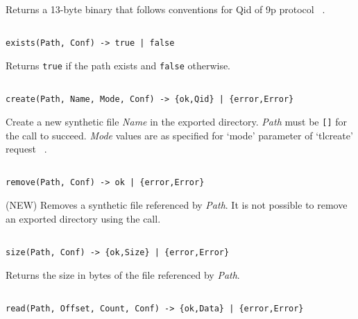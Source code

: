 Returns a 13-byte binary that follows conventions for Qid of 9p protocol
~\citep{9pintro}.

\begin{adjustwidth}{2.5em}{2.5em}
\begin{verbatim}

exists(Path, Conf) -> true | false

\end{verbatim}
\end{adjustwidth}

Returns \texttt{true} if the path exists and \texttt{false} otherwise.

\begin{adjustwidth}{2.5em}{2.5em}
\begin{verbatim}

create(Path, Name, Mode, Conf) -> {ok,Qid} | {error,Error} 

\end{verbatim}
\end{adjustwidth}

Create a new synthetic file \emph{Name} in the exported directory. \emph{Path} must be \texttt{[]}
for the call to succeed. \emph{Mode} values are as specified for `mode' parameter of
`tlcreate' request ~\citep{9p2000L}.

\begin{adjustwidth}{2.5em}{2.5em}
\begin{verbatim}

remove(Path, Conf) -> ok | {error,Error}

\end{verbatim}
\end{adjustwidth}

(NEW) Removes a synthetic file referenced by \emph{Path}. It is not possible to remove an
exported directory using the call.

\begin{adjustwidth}{2.5em}{2.5em}
\begin{verbatim}

size(Path, Conf) -> {ok,Size} | {error,Error}

\end{verbatim}
\end{adjustwidth}

Returns the size in bytes of the file referenced by \emph{Path}.

\begin{adjustwidth}{2.5em}{2.5em}
\begin{verbatim}

read(Path, Offset, Count, Conf) -> {ok,Data} | {error,Error}

\end{verbatim}
\end{adjustwidth}

